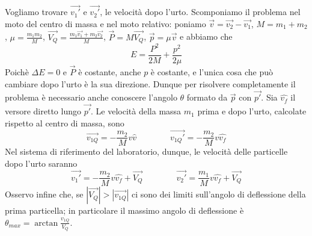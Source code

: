\documentclass[../main.tex]{subfiles}
\begin{document}
Vogliamo trovare $\overrightarrow{{v_1}'}$ e $\overrightarrow{{v_2}'}$, le velocità dopo l'urto.
Scomponiamo il problema nel moto del centro di massa e nel moto relativo: poniamo $\overrightarrow v = \overrightarrow {v_2} - \overrightarrow {v_1}$,
$M = m_1+m_2$, $\mu = \frac{m_1m_2}{M}$, $\overrightarrow {V_Q} = \frac{m_1\overrightarrow {v_1}+m_2\overrightarrow{v_2}}{M}$,
$\overrightarrow P = M\overrightarrow {V_Q}$, $\overrightarrow p = \mu \overrightarrow v$ e abbiamo che
\begin{equation}
 E = \frac{P^2}{2M} + \frac{p^2}{2\mu}
\end{equation}
Poichè $\Delta E = 0$ e $\overrightarrow P$ è costante, anche $p$ è costante, e l'unica cosa che può cambiare dopo l'urto è la sua direzione.
Dunque per risolvere completamente il problema è necessario anche conoscere l'angolo $\theta$ formato da $\overrightarrow p$ con $\overrightarrow {p'}$.
Sia $\hat{v_f}$ il versore diretto lungo $\overrightarrow {p'}$. Le velocità della massa $m_1$ prima e dopo l'urto, calcolate rispetto al centro di massa, sono
\begin{equation}
 \overrightarrow{v_{1Q}} = -\frac{m_2}{M}v\hat v \qquad \qquad
 \overrightarrow{{v_{1Q}}'} = -\frac{m_2}{M}v\hat{v_f}
\end{equation}
Nel sistema di riferimento del laboratorio, dunque, le velocità delle particelle dopo l'urto saranno
\begin{equation}\label{UrtiElastici}
 \overrightarrow {{v_1}'} = -\frac{m_2}{M}v\hat{v_f}+\overrightarrow {V_Q} \qquad \qquad
 \overrightarrow {{v_2}'} = \frac{m_1}{M}v\hat{v_f}+\overrightarrow {V_Q}
\end{equation}
Osservo infine che, se $|\overrightarrow {V_Q}| > |\overrightarrow{v_{1Q}}|$ ci sono dei limiti sull'angolo di deflessione della prima particella;
in particolare il massimo angolo di deflessione è $\theta_{max} = \arctan \frac{v_{1Q}}{V_Q}$.
\end{document}
